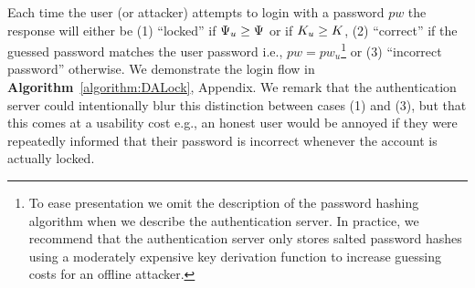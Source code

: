 Each time the user (or attacker) attempts to login with a password $pw$ the response will either be (1) ``locked'' if $\Psi_{u} \geq \Psi$ or if $K_{u} \geq K$, (2) ``correct'' if the guessed password matches the user password i.e., $pw = pw_u$\footnote{To ease presentation we omit the description of the password hashing algorithm when we describe the authentication server. In practice, we recommend that the authentication server only stores salted password hashes using a moderately expensive key derivation function to increase guessing costs for an offline attacker.} or (3) ``incorrect password'' otherwise. We demonstrate the login flow in \textbf{Algorithm}~\ref{algorithm:DALock}, Appendix. We remark that the authentication server could intentionally blur this distinction between cases (1) and (3), but that this comes at a usability cost e.g., an honest user would be annoyed if they were repeatedly informed that their password is incorrect whenever the account is actually locked.






